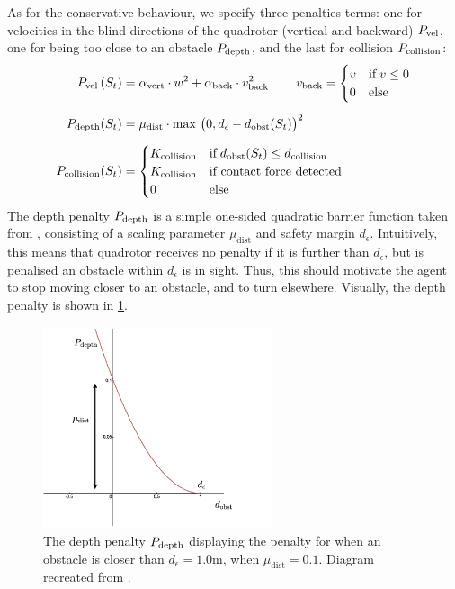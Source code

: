 As for the conservative behaviour, we specify three penalties terms: one for velocities in the blind directions of the quadrotor (vertical and backward) $P_{\text{vel}}$, one for being too close to an obstacle $P_{\text{depth}}$, and the last for collision $P_{\text{collision}}$:
\begin{align}
    P_{\text{vel}} \, (S_t) &=  \alpha_{\text{vert}} \cdot w^2 + \alpha_{\text{back}} \cdot v_{\text{back}}^2 \, \qquad v_{\text{back}} = 
    \begin{cases} 
      v & \text{if} \; v \leq 0 \\
      0 & \text{else} 
   \end{cases} \\[2mm]
   P_{\text{depth}} (S_t) &= \mu_{\text{dist}} \cdot \max \, \big(0, d_{\epsilon} - d_\text{obst}(S_t)\big)^2 \\[2mm]
  P_{\text{collision}} (S_t) &= \begin{cases}
     K_{\text{collision}} & \text{if} \; d_\text{obst}(S_t) \leq d_\text{collision} \\
     K_{\text{collision}} & \text{if contact force detected} \\
     0 & \text{else}
  \end{cases}
\end{align}
The depth penalty $P_{\text{depth}}$ is a simple one-sided quadratic barrier function taken from \cite{collision_free_MPC}, consisting of a scaling parameter $\mu_{\text{dist}}$ and safety margin $d_\epsilon$. Intuitively, this means that quadrotor receives no penalty if it is further than $d_\epsilon$, but is penalised an obstacle within $d_\epsilon$ is in sight. Thus, this should motivate the agent to stop moving closer to an obstacle, and to turn elsewhere. Visually, the depth penalty is shown in \cref{fig:5_depth_penalty}.
\begin{figure}[hbt]
    \centering
    \hspace{2cm}
    \includegraphics[width=0.6\textwidth]{figures/5_/5_depth_penalty.pdf}
    \caption{The depth penalty $P_{\text{depth}}$ displaying the penalty for when an obstacle is closer than  $d_\epsilon = 1.0$m, when $\mu_{\text{dist}} = 0.1$. Diagram recreated from \cite{collision_free_MPC}.}
    \label{fig:5_depth_penalty}
\end{figure}

